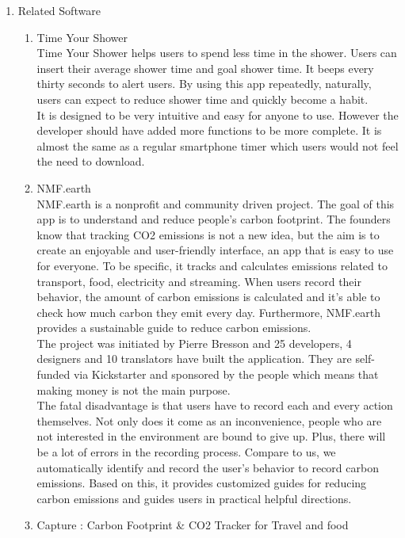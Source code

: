 \documentclass[11pt, conference]{IEEEtran}
\begin{document}
\begin{enumerate}[label=\arabic*]
    \item {\large{Related Software}}
        \begin{enumerate}[label=\alph*]
            \item Time Your Shower\\
            Time Your Shower helps users to spend less time in the shower. Users can insert their average shower time and goal shower time. It beeps every thirty seconds to alert users. By using this app repeatedly, naturally, users can expect to reduce shower time and quickly become a habit. \\
            It is designed to be very intuitive and easy for anyone to use. However the developer should have added more functions to be more complete. It is almost the same as a regular smartphone timer which users would not feel the need to download. 
            \item NMF.earth\\
            NMF.earth is a nonprofit and community driven project. The goal of this app is to understand and reduce people’s carbon footprint. The founders know that tracking CO2 emissions is not a new idea, but the aim is to create an enjoyable and user-friendly interface, an app that is easy to use for everyone. To be specific, it tracks and calculates emissions related to transport, food, electricity and streaming. When users record their behavior, the amount of carbon emissions is calculated and it's able to check how much carbon they emit every day. Furthermore, NMF.earth provides a sustainable guide to reduce carbon emissions. \\
            The project was initiated by Pierre Bresson and 25 developers, 4 designers and 10 translators have built the application. They are self-funded via Kickstarter and sponsored by the people which means that making money is not the main purpose. \\
            The fatal disadvantage is that users have to record each and every action themselves. Not only does it come as an inconvenience, people who are not interested in the environment are bound to give up. Plus, there will be a lot of errors in the recording process. Compare to us, we automatically identify and record the user’s behavior to record carbon emissions. Based on this, it provides customized guides for reducing carbon emissions and guides users in practical helpful directions. 
            \item Capture : Carbon Footprint \& CO2 Tracker for Travel and food

\end{enumerate}
\end{enumerate}
\end{document}
